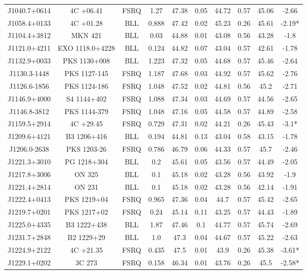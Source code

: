 \documentclass[12pt]{article}
\begin{document}
\begin{landscape}
\begin{longtable}{cccccccccc}
J1040.7+0614 & 4C +06.41 & FSRQ & 1.27 & 47.38 & 0.05 & 44.72 & 0.57 & 45.06 & -2.66 \\
J1058.4+0133 & 4C +01.28 & BLL & 0.888 & 47.42 & 0.02 & 45.23 & 0.26 & 45.61 & -2.19* \\
J1104.4+3812 & MKN 421 & BLL & 0.03 & 44.88 & 0.01 & 43.08 & 0.56 & 43.28 & -1.8 \\
J1121.0+4211 & EXO 1118.0+4228 & BLL & 0.124 & 44.82 & 0.07 & 43.04 & 0.57 & 42.61 & -1.78 \\
J1132.9+0033 & PKS 1130+008 & BLL & 1.223 & 47.32 & 0.05 & 44.68 & 0.57 & 45.46 & -2.64 \\
J1130.3-1448 & PKS 1127-145 & FSRQ & 1.187 & 47.68 & 0.03 & 44.92 & 0.57 & 45.62 & -2.76 \\
J1126.6-1856 & PKS 1124-186 & FSRQ & 1.048 & 47.52 & 0.02 & 44.81 & 0.56 & 45.2 & -2.71 \\
J1146.9+4000 & S4 1144+402 & FSRQ & 1.088 & 47.34 & 0.03 & 44.69 & 0.57 & 44.56 & -2.65 \\
J1146.8-3812 & PKS 1144-379 & FSRQ & 1.048 & 47.16 & 0.05 & 44.58 & 0.57 & 44.89 & -2.58 \\
J1159.5+2914 & 4C +29.45 & FSRQ & 0.729 & 47.31 & 0.02 & 44.21 & 0.26 & 45.43 & -3.1* \\
J1209.6+4121 & B3 1206+416 & BLL & 0.194 & 44.81 & 0.13 & 43.04 & 0.58 & 43.15 & -1.78 \\
J1206.0-2638 & PKS 1203-26 & FSRQ & 0.786 & 46.79 & 0.06 & 44.33 & 0.57 & 45.7 & -2.46 \\
J1221.3+3010 & PG 1218+304 & BLL & 0.2 & 45.61 & 0.05 & 43.56 & 0.57 & 44.49 & -2.05 \\
J1217.8+3006 & ON 325 & BLL & 0.1 & 45.18 & 0.02 & 43.28 & 0.56 & 43.92 & -1.9 \\
J1221.4+2814 & ON 231 & BLL & 0.1 & 45.18 & 0.02 & 43.28 & 0.56 & 42.14 & -1.91 \\
J1222.4+0413 & PKS 1219+04 & FSRQ & 0.965 & 47.36 & 0.04 & 44.7 & 0.57 & 45.42 & -2.65 \\
J1219.7+0201 & PKS 1217+02 & FSRQ & 0.24 & 45.14 & 0.11 & 43.25 & 0.57 & 44.43 & -1.89 \\
J1225.0+4335 & B3 1222+438 & BLL & 1.87 & 47.46 & 0.1 & 44.77 & 0.57 & 45.74 & -2.69 \\
J1231.7+2848 & B2 1229+29 & BLL & 1.0 & 47.3 & 0.04 & 44.67 & 0.57 & 45.22 & -2.63 \\
J1224.9+2122 & 4C +21.35 & FSRQ & 0.435 & 47.5 & 0.01 & 43.9 & 0.26 & 45.38 & -3.61* \\
J1229.1+0202 & 3C 273 & FSRQ & 0.158 & 46.34 & 0.01 & 43.76 & 0.26 & 45.5 & -2.58* \\

\end{longtable}
\end{landscape}
\end{document}
